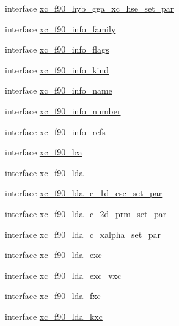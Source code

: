 \begin{DoxyCompactItemize}
\item 
interface \hyperlink{interfacexc__f90__lib__m_1_1xc__f90__hyb__gga__xc__hse__set__par}{xc\-\_\-f90\-\_\-hyb\-\_\-gga\-\_\-xc\-\_\-hse\-\_\-set\-\_\-par}
\item 
interface \hyperlink{interfacexc__f90__lib__m_1_1xc__f90__info__family}{xc\-\_\-f90\-\_\-info\-\_\-family}
\item 
interface \hyperlink{interfacexc__f90__lib__m_1_1xc__f90__info__flags}{xc\-\_\-f90\-\_\-info\-\_\-flags}
\item 
interface \hyperlink{interfacexc__f90__lib__m_1_1xc__f90__info__kind}{xc\-\_\-f90\-\_\-info\-\_\-kind}
\item 
interface \hyperlink{interfacexc__f90__lib__m_1_1xc__f90__info__name}{xc\-\_\-f90\-\_\-info\-\_\-name}
\item 
interface \hyperlink{interfacexc__f90__lib__m_1_1xc__f90__info__number}{xc\-\_\-f90\-\_\-info\-\_\-number}
\item 
interface \hyperlink{interfacexc__f90__lib__m_1_1xc__f90__info__refs}{xc\-\_\-f90\-\_\-info\-\_\-refs}
\item 
interface \hyperlink{interfacexc__f90__lib__m_1_1xc__f90__lca}{xc\-\_\-f90\-\_\-lca}
\item 
interface \hyperlink{interfacexc__f90__lib__m_1_1xc__f90__lda}{xc\-\_\-f90\-\_\-lda}
\item 
interface \hyperlink{interfacexc__f90__lib__m_1_1xc__f90__lda__c__1d__csc__set__par}{xc\-\_\-f90\-\_\-lda\-\_\-c\-\_\-1d\-\_\-csc\-\_\-set\-\_\-par}
\item 
interface \hyperlink{interfacexc__f90__lib__m_1_1xc__f90__lda__c__2d__prm__set__par}{xc\-\_\-f90\-\_\-lda\-\_\-c\-\_\-2d\-\_\-prm\-\_\-set\-\_\-par}
\item 
interface \hyperlink{interfacexc__f90__lib__m_1_1xc__f90__lda__c__xalpha__set__par}{xc\-\_\-f90\-\_\-lda\-\_\-c\-\_\-xalpha\-\_\-set\-\_\-par}
\item 
interface \hyperlink{interfacexc__f90__lib__m_1_1xc__f90__lda__exc}{xc\-\_\-f90\-\_\-lda\-\_\-exc}
\item 
interface \hyperlink{interfacexc__f90__lib__m_1_1xc__f90__lda__exc__vxc}{xc\-\_\-f90\-\_\-lda\-\_\-exc\-\_\-vxc}
\item 
interface \hyperlink{interfacexc__f90__lib__m_1_1xc__f90__lda__fxc}{xc\-\_\-f90\-\_\-lda\-\_\-fxc}
\item 
interface \hyperlink{interfacexc__f90__lib__m_1_1xc__f90__lda__kxc}{xc\-\_\-f90\-\_\-lda\-\_\-kxc}
\item 

\end{DoxyCompactItemize}
